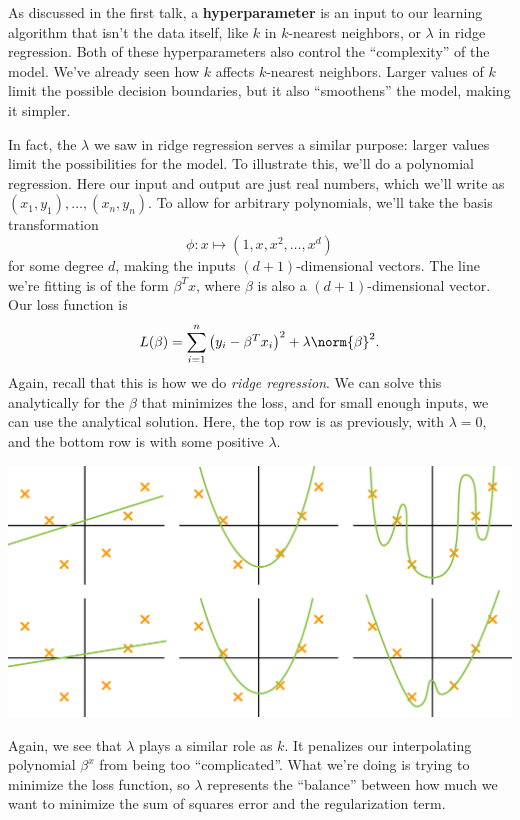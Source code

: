 \documentclass[11pt,paper=letter]{scrartcl}
\begin{document}
As discussed in the first talk, a \textbf{hyperparameter} is an input to our learning algorithm that isn't the data itself, like $k$ in $k$-nearest neighbors, or $\lambda$ in ridge regression. Both of these hyperparameters also control the ``complexity'' of the model. We've already seen how $k$ affects $k$-nearest neighbors. Larger values of $k$ limit the possible decision boundaries, but it also ``smoothens'' the model, making it simpler.

In fact, the $\lambda$ we saw in ridge regression serves a similar purpose: larger values limit the possibilities for the model. To illustrate this, we'll do a polynomial regression. Here our input and output are just real numbers, which we'll write as $(x_1, y_1), \ldots, (x_n, y_n)$. To allow for arbitrary polynomials, we'll take the basis transformation \[
  \phi : x \mapsto (1, x, x^2, \ldots, x^d)
\]
for some degree $d$, making the inputs $(d + 1)$-dimensional vectors. The line we're fitting is of the form $\beta^Tx$, where $\beta$ is also a $(d + 1)$-dimensional vector. Our loss function is \[
  L(\beta) = \sum_{i=1}^n \left(y_i - \beta^Tx_i\right)^2 + \lambda\norm{\beta}^2.
\]
Again, recall that this is how we do \textit{ridge regression}. We can solve this analytically for the $\beta$ that minimizes the loss, and for small enough inputs, we can use the analytical solution. Here, the top row is as previously, with $\lambda = 0$, and the bottom row is with some positive $\lambda$.
\begin{center}
  \includegraphics[width=\textwidth]{18.png}
\end{center}
Again, we see that $\lambda$ plays a similar role as $k$. It penalizes our interpolating polynomial $\beta^x$ from being too ``complicated''. What we're doing is trying to minimize the loss function, so $\lambda$ represents the ``balance'' between how much we want to minimize the sum of squares error and the regularization term.
\end{document}
